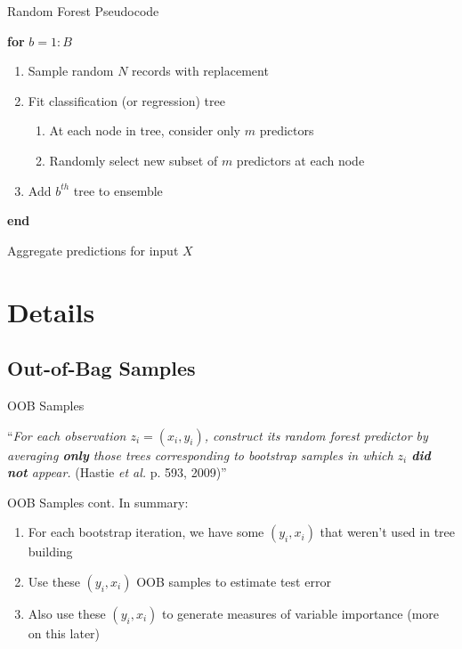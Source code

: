 \documentclass[pdf]{beamer}
\begin{document}
	\begin{frame}{Random Forest Pseudocode}
		\begin{enumerate}[]
			{\selectfont
			\item \textbf{for} $b = 1:B$
				\begin{enumerate}[  ]
					\item \hspace{3 mm} Sample random $N$ records with replacement
					\item \hspace{3 mm} Fit classification (or regression) tree
					\begin{enumerate}[ ] 
						\item \hspace{6 mm} At each node in tree, consider only $m$ predictors
						\item \hspace{6 mm} Randomly select new subset of $m$ predictors at each node
					\end{enumerate}
					\item \hspace{3 mm} Add $b^{th}$ tree to ensemble
				\end{enumerate}
			\item \textbf{end}
			\item Aggregate predictions for input $X$
			}
		\end{enumerate}
	\end{frame}
	

\section{Details}
	\subsection{Out-of-Bag Samples}
		\begin{frame}{OOB Samples}
		
			{\selectfont
			``\textit{For each observation $z_i = (x_i, y_i)$, construct its random forest predictor by averaging \textbf{only} those trees corresponding to bootstrap samples in which $z_i$ \textbf{did not} appear.} (Hastie \textit{et al.} p. 593, 2009)''
			}
		\end{frame}
		
		\begin{frame} {OOB Samples cont.}
		In summary: \\
			\begin{enumerate}
				\item For each bootstrap iteration, we have some $(y_i, x_i)$  that weren't used in tree building
				\item Use these $(y_i, x_i)$ OOB samples to estimate test error
				\item Also use these $(y_i, x_i)$ to generate measures of variable importance (more on this later)
			\end{enumerate}
		\end{frame}
		
\end{document}
